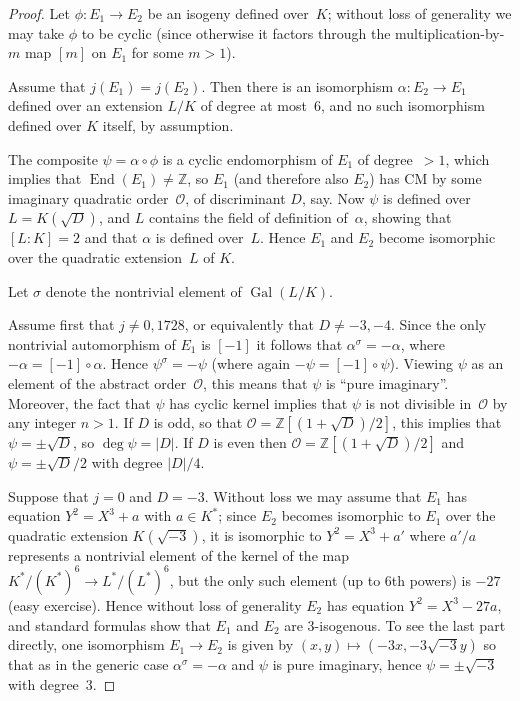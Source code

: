 \documentclass{article}
\def\Z{{\mathbb Z}}
\def\OO{{\mathcal O}}
\DeclareMathOperator{\Gal}{Gal}
\DeclareMathOperator{\End}{End}
\begin{document}
\begin{proof}
Let $\phi:E_1\to E_2$ be an isogeny defined over~$K$; without loss of
generality we may take $\phi$ to be cyclic (since otherwise it factors
through the multiplication-by-$m$ map $[m]$ on $E_1$ for some $m>1$).

Assume that $j(E_1)=j(E_2)$.  Then there is an isomorphism
$\alpha:E_2\to E_1$ defined over an extension $L/K$ of degree at
most~$6$, and no such isomorphism defined over $K$ itself, by
assumption.

The composite $\psi=\alpha\circ\phi$ is a cyclic endomorphism of $E_1$
of degree~${}>1$, which implies that $\End(E_1)\ne \Z$, so $E_1$ (and
therefore also $E_2$) has CM by some imaginary quadratic order~$\OO$, of
discriminant $D$, say.  Now $\psi$ is defined over $L=K(\sqrt{D})$,
and $L$ contains the field of definition of~$\alpha$, showing that
$[L:K]=2$ and that $\alpha$ is defined over~$L$.  Hence $E_1$ and
$E_2$ become isomorphic over the quadratic extension~$L$ of $K$.

Let $\sigma$ denote the nontrivial element of $\Gal(L/K)$.

Assume first that $j\not=0, 1728$, or equivalently that $D\not=-3,-4$.
Since the only nontrivial automorphism of $E_1$ is $[-1]$ it follows
that $\alpha^{\sigma}=-\alpha$, where $-\alpha=[-1]\circ\alpha$. Hence
$\psi^{\sigma}=-\psi$ (where again $-\psi=[-1]\circ\psi$).  Viewing
$\psi$ as an element of the abstract order~$\OO$, this means that
$\psi$ is ``pure imaginary''.  Moreover, the fact that $\psi$ has
cyclic kernel implies that $\psi$ is not divisible in~$\OO$ by any
integer $n>1$.  If $D$ is odd, so that $\OO=\Z[(1+\sqrt{D})/2]$, this
implies that $\psi=\pm\sqrt{D}$, so $\deg\psi=|D|$.  If $D$ is even
then $\OO=\Z[(1+\sqrt{D})/2]$ and $\psi=\pm\sqrt{D}/2$ with degree
$|D|/4$.

Suppose that $j=0$ and $D=-3$.  Without loss we may assume that $E_1$
has equation $Y^2=X^3+a$ with $a\in K^*$; since $E_2$ becomes
isomorphic to $E_1$ over the quadratic extension $K(\sqrt{-3})$, it is
isomorphic to $Y^2=X^3+a'$ where $a'/a$ represents a nontrivial
element of the kernel of the map $K^*/(K^*)^6 \to L^*/(L^*)^6$, but
the only such element (up to 6th powers) is $-27$ (easy exercise).
Hence without loss of generality $E_2$ has equation $Y^2=X^3-27a$, and
standard formulas show that $E_1$ and $E_2$ are $3$-isogenous.  To see
the last part directly, one isomorphism $E_1\to E_2$ is given by
$(x,y)\mapsto(-3x,-3\sqrt{-3}y)$ so that as in the generic case
$\alpha^{\sigma}=-\alpha$ and $\psi$ is pure imaginary, hence
$\psi=\pm\sqrt{-3}$ with degree~$3$.


\end{proof}
\end{document}
